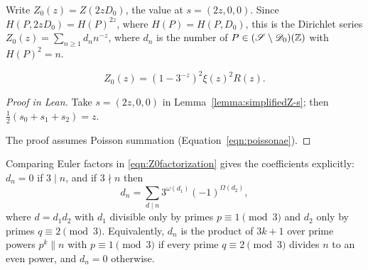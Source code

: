 \begin{equationnode}

\label{eqn:Z0factorization}


\leanok

Write $Z_0(z)=Z(2zD_0)$, the value at $s=(2z,0,0)$. Since $H(P,2zD_0)=H(P)^{2z}$, where $H(P)=H(P,D_0)$, this is the Dirichlet series $Z_0(z)=\sum_{n\geq1}d_nn^{-z}$, where $d_n$ is the number of $P\in(\mathscr{S}\setminus\mathscr{D}_0)(\mathbb{Z})$ with $H(P)^2=n$.

\begin{equation*} Z_0(z)=\left(1-3^{-z}\right)^2\xi(z)^2R(z). \end{equation*}

\end{equationnode}

\begin{proof}[Proof in Lean]

\leanok


Take $s=(2z,0,0)$ in Lemma~\ref{lemma:simplifiedZ-s}; then $\tfrac12(s_0+s_1+s_2)=z$.

The proof assumes Poisson summation (Equation~\ref{eqn:poissonae}).

\end{proof}

\begin{remarknode}

\label{rem:heightCoefficients}


\leanok



 Comparing Euler factors in \eqref{eqn:Z0factorization} gives the coefficients explicitly: $d_n=0$ if $3\mid n$, and if $3\nmid n$ then \[ d_n=\sum_{d\mid n}3^{\omega(d_1)}(-1)^{\Omega(d_2)}, \] where $d=d_1d_2$ with $d_1$ divisible only by primes $p\equiv1\pmod3$ and $d_2$ only by primes $q\equiv2\pmod3$. Equivalently, $d_n$ is the product of $3k+1$ over prime powers $p^k\parallel n$ with $p\equiv1\pmod3$ if every prime $q\equiv2\pmod3$ divides $n$ to an even power, and $d_n=0$ otherwise. 

\end{remarknode}

